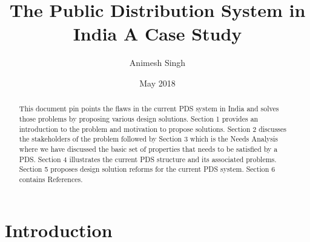 \documentclass{article}
\title{\textbf{The Public Distribution System in India}
\linebreak A Case Study}
\author{Animesh Singh}
\date{May 2018}
\begin{document}
\maketitle

\begin{abstract}
This document pin points the flaws in the current PDS system in India and solves those problems by proposing various design solutions. Section 1 provides an introduction to the problem and motivation to propose solutions. Section 2 discusses the stakeholders of the problem followed by Section 3 which is the Needs Analysis where we have discussed the basic set of properties that needs to be satisfied by a PDS. Section 4 illustrates the current PDS structure and its associated problems. Section 5 proposes design solution reforms for the current PDS system. Section 6 contains References.
\end{abstract}

\section{Introduction}
\end{document}
